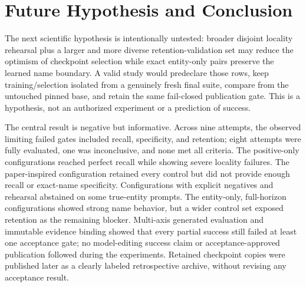 \section{Future Hypothesis and Conclusion}

The next scientific hypothesis is intentionally untested: broader disjoint
locality rehearsal plus a larger and more diverse retention-validation set may
reduce the optimism of checkpoint selection while exact entity-only pairs
preserve the learned name boundary. A valid study would predeclare those rows,
keep training/selection isolated from a genuinely fresh final suite, compare
from the untouched pinned base, and retain the same fail-closed publication
gate. This is a hypothesis, not an authorized experiment or a prediction of
success. 

The central result is negative but informative. Across nine attempts, the
observed limiting failed gates included recall, specificity, and retention;
eight attempts were fully evaluated, one was inconclusive, and none met all
criteria. The positive-only
configurations reached perfect recall while showing severe locality failures.
The paper-inspired configuration retained every control but did not provide
enough recall or exact-name specificity. Configurations with explicit negatives
and rehearsal abstained on some true-entity prompts. The entity-only,
full-horizon configurations showed strong name behavior, but a wider control
set exposed retention as the remaining blocker. Multi-axis generated
evaluation and immutable evidence binding showed that every partial success
still failed at least one acceptance gate; no model-editing success claim or
acceptance-approved publication followed during the experiments. Retained
checkpoint copies were published later as a clearly labeled retrospective
archive, without revising any acceptance result.
